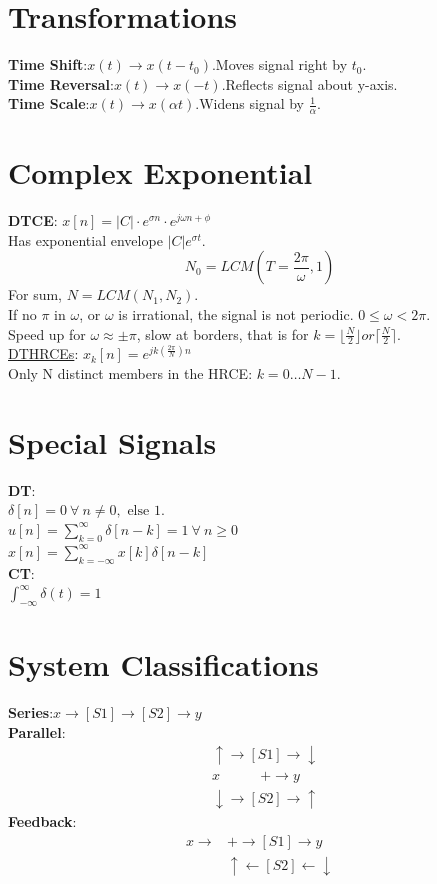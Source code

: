 \documentclass[8pt]{extarticle}
\begin{document}
\section*{Transformations}
\textbf{Time Shift}:$x(t)\rightarrow x(t-t_0)$.Moves signal right by $t_0$.\\
\textbf{Time Reversal}:$x(t)\rightarrow x(-t)$.Reflects signal about y-axis.\\
\textbf{Time Scale}:$x(t)\rightarrow x(\alpha t)$.Widens signal by $\frac{1}{\alpha}$.
\section*{Complex Exponential}
\textbf{DTCE}:
$x[n] = |C|\cdot e^{\sigma n} \cdot e^{j\omega n +\phi}$\\
Has exponential envelope $|C|e^{\sigma t}$.\\
\begin{equation*}
    N_0 = LCM\left(T = \frac{2\pi}{\omega}, 1\right)
\end{equation*}
For sum, $N = LCM(N_1,N_2)$.\\
If no $\pi$ in $\omega$, or $\omega$ is irrational, the signal is not periodic.
$0\leq \omega < 2\pi$.
\\Speed up for $\omega\approx\pm\pi$, slow at borders, that is for $k=\lfloor\frac{N}{2}\rfloor  or \lceil\frac{N}{2}\rceil$.\\
\underline{DTHRCEs}: $x_k[n] = e^{jk(\frac{2\pi}{N})n}$\\
Only N distinct members in the HRCE: $k = 0 \ldots N-1$.
\section*{Special Signals}
\textbf{DT}:\\
$\delta[n] = 0 ~\forall~ n \neq 0,\text{ else } 1$.\\
$u[n] =\sum_{k=0}^{\infty}\delta[n-k] = 1 ~\forall~ n\geq 0$\\
$x[n] = \sum_{k=-\infty}^{\infty}x[k]\delta[n-k]$\\
\textbf{CT}:\\
$\int_{-\infty}^{\infty}\delta(t) = 1$
\section*{System Classifications}
\textbf{Series}:$x \rightarrow [S1]\rightarrow[S2]\rightarrow y$\\
\textbf{Parallel}:
\begin{align*}
     & \uparrow\rightarrow [S1] \rightarrow \downarrow \\
     & x ~~~~~~~~~~~~~ + \rightarrow y                 \\
     & \downarrow\rightarrow [S2]\rightarrow \uparrow
\end{align*}
\textbf{Feedback}:
\begin{align*}
    x\rightarrow & +\rightarrow [S1] \rightarrow y              \\
                 & \uparrow\leftarrow [S2]\leftarrow \downarrow
\end{align*}
\end{document}
